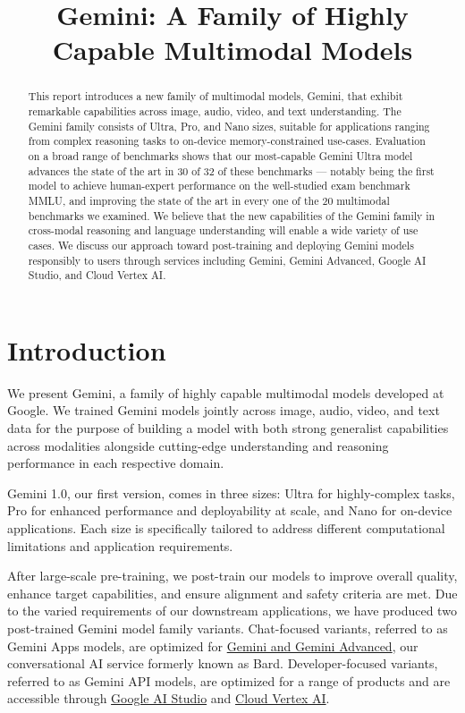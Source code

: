 \title{Gemini: A Family of Highly Capable Multimodal Models}

\begin{abstract}
This report introduces a new family of multimodal models, Gemini, that exhibit remarkable capabilities across image, audio, video, and text understanding. The Gemini family consists of Ultra, Pro, and Nano sizes, suitable for applications ranging from complex reasoning tasks to on-device memory-constrained use-cases. Evaluation on a broad range of benchmarks shows that our most-capable Gemini Ultra model advances the state of the art in 30 of 32 of these benchmarks --- notably being the first model to achieve human-expert performance on the well-studied exam benchmark MMLU, and improving the state of the art in every one of the 20 multimodal benchmarks we examined. We believe that the new capabilities of the Gemini family in cross-modal reasoning and language understanding will enable a wide variety of use cases. We discuss our approach toward post-training and deploying Gemini models responsibly to users through services including Gemini, Gemini Advanced, Google AI Studio, and Cloud Vertex AI.
\end{abstract}

\section{Introduction}
\label{sec:intro}

We present Gemini, a family of highly capable multimodal models developed at Google. We trained Gemini models jointly across image, audio, video, and text data for the purpose of building a model with both strong generalist capabilities across modalities alongside cutting-edge understanding and reasoning performance in each respective domain. 

Gemini 1.0, our first version, comes in three sizes: Ultra for highly-complex tasks, Pro for enhanced performance and deployability at scale, and Nano for on-device applications. Each size is specifically tailored to address different computational limitations and application requirements. 

After large-scale pre-training, we post-train our models to improve overall quality, enhance target capabilities, and ensure alignment and safety criteria are met. Due to the varied requirements of our downstream applications, we have produced two post-trained Gemini model family variants. Chat-focused variants, referred to as Gemini Apps models, are optimized for \href{https://gemini.google.com}{Gemini and Gemini Advanced}, our conversational AI service formerly known as Bard. Developer-focused variants, referred to as Gemini API models, are optimized for a range of products and are accessible through \href{https://makersuite.google.com}{Google AI Studio} and \href{https://cloud.google.com/vertex-ai}{Cloud Vertex AI}.

